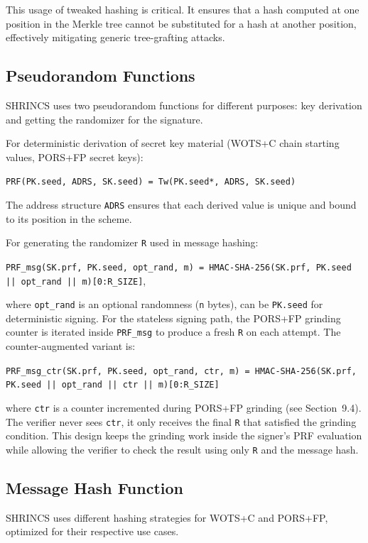 This usage of tweaked hashing is critical. It ensures that a hash computed at one position in the Merkle tree cannot be substituted for a hash at another position, effectively mitigating generic tree-grafting attacks.

\subsection{Pseudorandom Functions}
SHRINCS uses two pseudorandom functions for different purposes: key derivation and getting the randomizer for the signature.

For deterministic derivation of secret key material (WOTS+C chain starting values, PORS+FP secret keys):

\begin{center}
    \texttt{PRF(PK.seed, ADRS, SK.seed) = Tw(PK.seed*, ADRS, SK.seed)}
\end{center}

The address structure \texttt{ADRS} ensures that each derived value is unique and bound to its position in the scheme.

For generating the randomizer \texttt{R} used in message hashing:

\begin{center}
    \texttt{PRF\_msg(SK.prf, PK.seed, opt\_rand, m) = HMAC-SHA-256(SK.prf, PK.seed || opt\_rand || m)[0:R\_SIZE]},
\end{center}
where \texttt{opt\_rand} is an optional randomness (\texttt{n} bytes), can be \texttt{PK.seed} for deterministic signing.
For the stateless signing path, the PORS+FP grinding counter is iterated inside \texttt{PRF\_msg} to produce a fresh \texttt{R} on each attempt. The counter-augmented variant is:

\begin{center}
    \texttt{PRF\_msg\_ctr(SK.prf, PK.seed, opt\_rand, ctr, m) = HMAC-SHA-256(SK.prf, PK.seed || opt\_rand || ctr || m)[0:R\_SIZE]}
\end{center}

where \texttt{ctr} is a counter incremented during PORS+FP grinding (see Section~9.4). The verifier never sees \texttt{ctr}, it only receives the final \texttt{R} that satisfied the grinding condition. This design keeps the grinding work inside the signer's PRF evaluation while allowing the verifier to check the result using only \texttt{R}  and the message hash.

\subsection{Message Hash Function}
SHRINCS uses different hashing strategies for WOTS+C and PORS+FP, optimized for their respective use cases.

